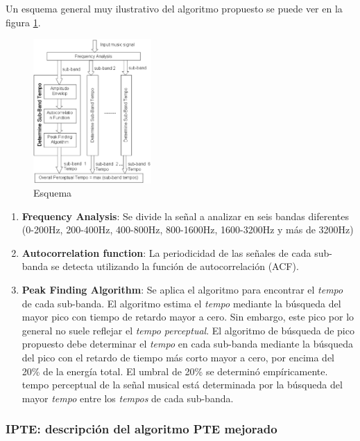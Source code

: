 \documentclass[12pt,a4paper,titlepage]{report}
\begin{document}
Un esquema general muy ilustrativo del algoritmo propuesto se puede ver en la figura \ref{fig:esquema}.\\

\begin{figure}[h!]
	\vspace{-20pt}
	\begin{center}
	\includegraphics[width=0.4\textwidth]{./pics/esquema.jpg}
	\end{center}
	\caption{Esquema}
	\label{fig:esquema}
\end{figure}

\begin{enumerate}
\item \textbf{Frequency Analysis}: Se divide la señal a analizar en seis bandas diferentes (0-200Hz, 200-400Hz, 400-800Hz, 800-1600Hz, 1600-3200Hz y más de 3200Hz)
\item \textbf{Autocorrelation function}: La periodicidad de las señales de cada sub-banda se detecta utilizando la función de autocorrelación (ACF).
\item \textbf{Peak Finding Algorithm}: Se aplica el algoritmo para encontrar el \emph{tempo} de cada sub-banda. El algoritmo estima el \emph{tempo} mediante la búsqueda del mayor pico con tiempo de retardo mayor a cero. Sin embargo, este pico por lo general no suele reflejar el \emph{tempo perceptual}. El algoritmo de búsqueda de pico propuesto debe determinar el \emph{tempo} en cada sub-banda mediante la búsqueda del pico con el retardo de tiempo más corto mayor a cero, por encima del 20\% de la energía total. El umbral de 20\% se determinó empíricamente.\\
tempo perceptual de la señal musical está determinada por la búsqueda del mayor \emph{tempo} entre los \emph{tempos} de cada sub-banda.
\end{enumerate}

\subsubsection*{IPTE: descripción del algoritmo PTE mejorado}
\end{document}

